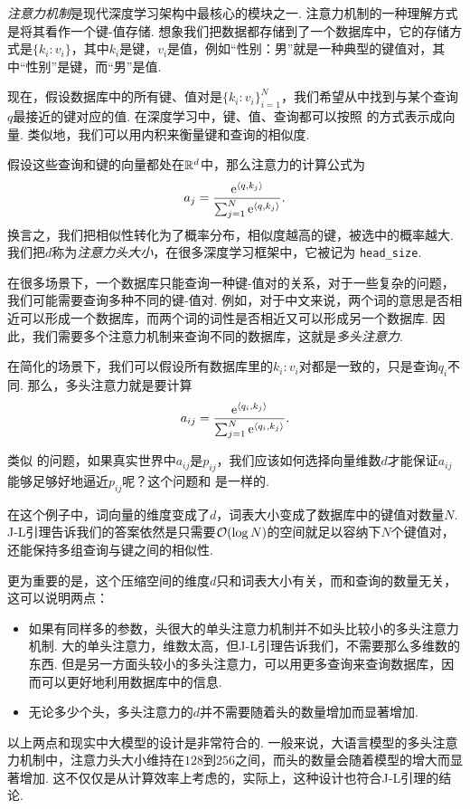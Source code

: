 \begin{example}[多头注意力]
\textit{注意力机制}是现代深度学习架构中最核心的模块之一. 注意力机制的一种理解方式是将其看作一个键-值存储. 想象我们把数据都存储到了一个数据库中，它的存储方式是$\{k_i:v_i\}$，其中$k_i$是键，$v_i$是值，例如“性别：男”就是一种典型的键值对，其中“性别”是键，而“男”是值. 

现在，假设数据库中的所有键、值对是$\{k_i:v_i\}_{i=1}^N$，我们希望从中找到与某个查询$q$最接近的键对应的值. 在深度学习中，键、值、查询都可以按照 的方式表示成向量. 类似地，我们可以用内积来衡量键和查询的相似度. 

假设这些查询和键的向量都处在$\mathbb{R}^d$中，那么注意力的计算公式为
\[
    a_j = \frac{\mathrm{e}^{\left\langle{q},{k_j}\right\rangle}}{\sum_{j=1}^N \mathrm{e}^{\left\langle{q},{k_j}\right\rangle}}.
\]
换言之，我们把相似性转化为了概率分布，相似度越高的键，被选中的概率越大. 我们把$d$称为\textit{注意力头大小}，在很多深度学习框架中，它被记为 \verb#head_size#.

在很多场景下，一个数据库只能查询一种键-值对的关系，对于一些复杂的问题，我们可能需要查询多种不同的键-值对. 例如，对于中文来说，两个词的意思是否相近可以形成一个数据库，而两个词的词性是否相近又可以形成另一个数据库. 因此，我们需要多个注意力机制来查询不同的数据库，这就是\textit{多头注意力}.

在简化的场景下，我们可以假设所有数据库里的$k_i:v_i$对都是一致的，只是查询$q_i$不同. 那么，多头注意力就是要计算
\[
    a_{ij} = \frac{\mathrm{e}^{\left\langle{q_i},{k_j}\right\rangle}}{\sum_{j=1}^N \mathrm{e}^{\left\langle{q_i},{k_j}\right\rangle}}.
\]

类似 的问题，如果真实世界中$a_{ij}$是$p_{ij}$，我们应该如何选择向量维数$d$才能保证$a_{ij}$能够足够好地逼近$p_{ij}$呢？这个问题和 是一样的.

在这个例子中，词向量的维度变成了$d$，词表大小变成了数据库中的键值对数量$N$. J-L引理告诉我们的答案依然是只需要$\mathcal{O}(\log N)$的空间就足以容纳下$N$个键值对，还能保持多组查询与键之间的相似性. 

更为重要的是，这个压缩空间的维度$d$只和词表大小有关，而和查询的数量无关，这可以说明两点：
\begin{itemize}
    \item 如果有同样多的参数，头很大的单头注意力机制并不如头比较小的多头注意力机制. 大的单头注意力，维数太高，但J-L引理告诉我们，不需要那么多维数的东西. 但是另一方面头较小的多头注意力，可以用更多查询来查询数据库，因而可以更好地利用数据库中的信息.
    \item 无论多少个头，多头注意力的$d$并不需要随着头的数量增加而显著增加. 
\end{itemize}

以上两点和现实中大模型的设计是非常符合的. 一般来说，大语言模型的多头注意力机制中，注意力头大小维持在$128$到$256$之间，而头的数量会随着模型的增大而显著增加. 这不仅仅是从计算效率上考虑的，实际上，这种设计也符合J-L引理的结论.
\end{example}

